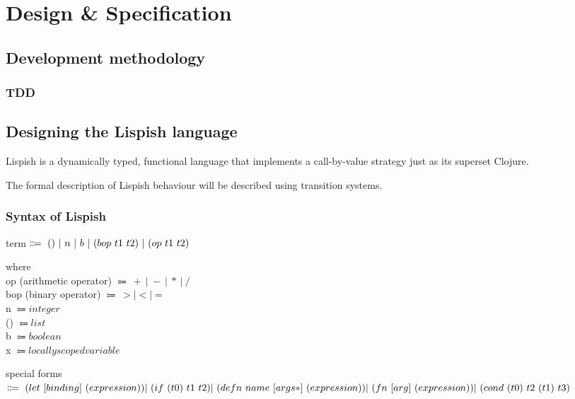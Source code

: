 \chapter{Design \& Specification}

\section{Development methodology}



\subsection{TDD}

\section{Designing the Lispish language}

Lispish is a dynamically typed, functional language that implements a call-by-value strategy just as its superset Clojure.

The formal description of Lispish behaviour will be described using transition systems.

\subsection{Syntax of Lispish}

term $\Coloneqq \ () \ \vert \ n \ \vert \ b \ \vert \ (bop \ t1 \ t2) \ \vert \ (op \ t1 \ t2) \\ $

where \\

op (arithmetic operator) $\Coloneqq \ + \ \vert \ - \ \vert \ * \ \vert \ /$
\\
bop (binary operator) $\Coloneqq \ > \vert < \vert =$
\\
n $\Coloneqq integer $
\\
() $\Coloneqq list $
\\
b $\Coloneqq boolean $
\\ 
x $\Coloneqq locally scoped variable $

special forms 
$\Coloneqq \ (let \ [binding] \ (expression)) \\
| \	(if \ (t0) \ t1 \ t2) \\
| \	(defn \ name \ [args*] \ (expression)) \\
| \	(fn \ [arg] \ (expression)) \\ 
| \	(cond \ (t0) \ t2 \ (t1) \ t3) \\
$

